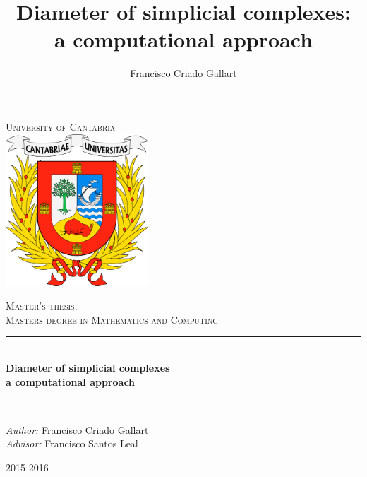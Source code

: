 \documentclass[12pt,a4paper]{article}
\title{ Diameter of simplicial complexes: \\ a computational approach}
\author{Francisco Criado Gallart}
\date{}
\theoremstyle{plain}
\theoremstyle{definition}
\begin{document}

\setlength{\parindent}{4ex}

\thispagestyle{plain}

\begin{titlepage}

\newcommand{\HRule}{\rule{\linewidth}{0.5mm}} %

\center %
 

\textsc{\LARGE University of Cantabria}\\[1.5cm] %

\includegraphics[width=0.4\textwidth]{img/logo_UC.png}

\textsc{\Large Master's thesis.}\\[0.5cm] %
\textsc{\large Masters degree in Mathematics and Computing}\\[0.5cm] %


\HRule \\[0.4cm]
{ \huge \bfseries Diameter of simplicial complexes \\ a computational approach}\\[0.4cm] %
\HRule \\[1.5cm]
 

\large
\emph{Author:} Francisco Criado Gallart \\
\emph{Advisor:} Francisco Santos Leal



{\large 2015-2016}\\[3cm] %


 

\vfill %

\end{titlepage}
\end{document}
